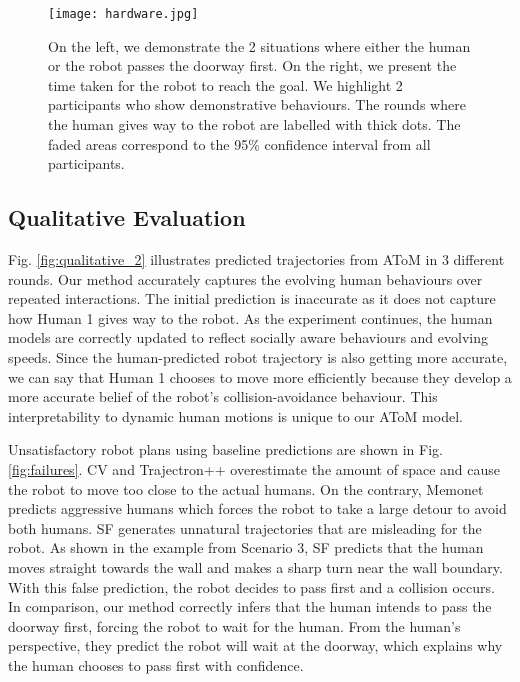 \begin{figure}
    \centering
    \texttt{[image: hardware.jpg]}
    \vspace{-5mm}
    \caption{On the left, we demonstrate the 2 situations where either the human or the robot passes the doorway first. On the right, we present the time taken for the robot to reach the goal. We highlight 2 participants who show demonstrative behaviours. The rounds where the human gives way to the robot are labelled with thick dots. The faded areas correspond to the 95\% confidence interval from all participants.}
    \vspace{-3mm}
    \label{fig:hardware}
\end{figure}

\subsection{Qualitative Evaluation}
Fig. \ref{fig:qualitative_2} illustrates predicted trajectories from AToM in 3 different rounds. Our method accurately captures the evolving human behaviours over repeated interactions. 
The initial prediction is inaccurate as it does not capture how Human 1 gives way to the robot. As the experiment continues, the human models are correctly updated to reflect socially aware behaviours and evolving speeds. 
Since the human-predicted robot trajectory is also getting more accurate, we can say that Human 1 chooses to move more efficiently because they develop a more accurate belief of the robot's collision-avoidance behaviour. This interpretability to dynamic human motions is unique to our AToM model.

Unsatisfactory robot plans using baseline predictions are shown in Fig. \ref{fig:failures}. CV and Trajectron++ overestimate the amount of space and cause the robot to move too close to the actual humans. 
On the contrary, Memonet predicts aggressive humans which forces the robot to take a large detour to avoid both humans. 
SF generates unnatural trajectories that are misleading for the robot. 
As shown in the example from Scenario 3, SF predicts that the human moves straight towards the wall and makes a sharp turn near the wall boundary. With this false prediction, the robot decides to pass first and a collision occurs. 
In comparison, our method correctly infers that the human intends to pass the doorway first, forcing the robot to wait for the human. From the human's perspective, they predict the robot will wait at the doorway, which explains why the human chooses to pass first with confidence.

